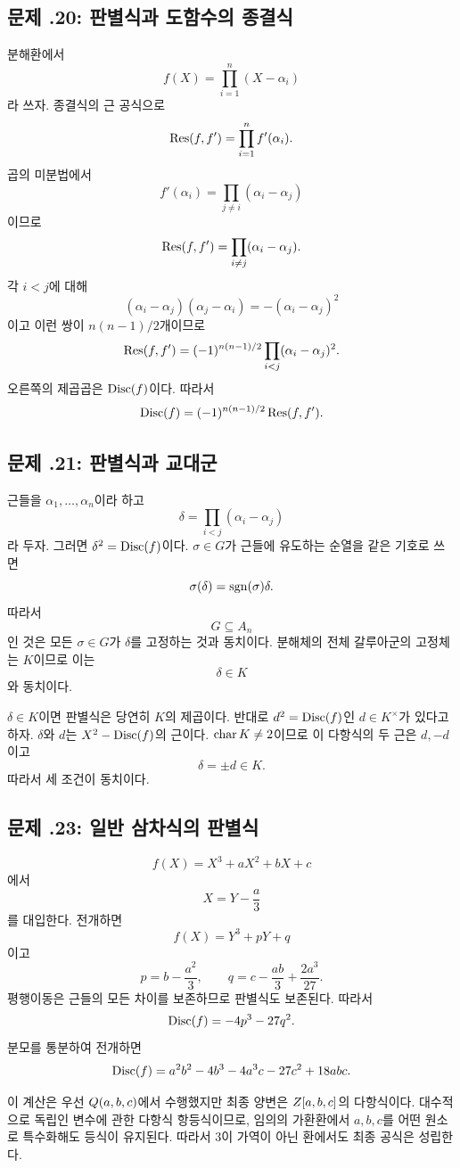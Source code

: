 \subsection*{문제 \thechapter.20: 판별식과 도함수의 종결식}

\begin{solution}
분해환에서
\[
  f(X)=\prod_{i=1}^n(X-\alpha_i)
\]
라 쓰자. 종결식의 근 공식으로
\[
  \operatorname{Res}(f,f')=\prod_{i=1}^n f'(\alpha_i).
\]
곱의 미분법에서
\[
  f'(\alpha_i)=\prod_{j\ne i}(\alpha_i-\alpha_j)
\]
이므로
\[
  \operatorname{Res}(f,f')
  =\prod_{i\ne j}(\alpha_i-\alpha_j).
\]
각 $i<j$에 대해
\[
  (\alpha_i-\alpha_j)(\alpha_j-\alpha_i)
  =-(\alpha_i-\alpha_j)^2
\]
이고 이런 쌍이 $n(n-1)/2$개이므로
\[
  \operatorname{Res}(f,f')
  =(-1)^{n(n-1)/2}
  \prod_{i<j}(\alpha_i-\alpha_j)^2.
\]
오른쪽의 제곱곱은 $\operatorname{Disc}(f)$이다. 따라서
\[
  \operatorname{Disc}(f)=(-1)^{n(n-1)/2}\operatorname{Res}(f,f').
\]
\end{solution}

\subsection*{문제 \thechapter.21: 판별식과 교대군}

\begin{solution}
근들을 $\alpha_1,\dots,\alpha_n$이라 하고
\[
  \delta=\prod_{i<j}(\alpha_i-\alpha_j)
\]
라 두자. 그러면 $\delta^2=\operatorname{Disc}(f)$이다. $\sigma\in G$가 근들에 유도하는 순열을 같은 기호로 쓰면
\[
  \sigma(\delta)=\operatorname{sgn}(\sigma)\delta.
\]
따라서
\[
  G\subseteq A_n
\]
인 것은 모든 $\sigma\in G$가 $\delta$를 고정하는 것과 동치이다. 분해체의 전체 갈루아군의 고정체는 $K$이므로 이는
\[
  \delta\in K
\]
와 동치이다.

$\delta\in K$이면 판별식은 당연히 $K$의 제곱이다. 반대로 $d^2=\operatorname{Disc}(f)$인 $d\in K^\times$가 있다고 하자. $\delta$와 $d$는 $X^2-\operatorname{Disc}(f)$의 근이다. $\operatorname{char} K\ne2$이므로 이 다항식의 두 근은 $d,-d$이고
\[
  \delta=\pm d\in K.
\]
따라서 세 조건이 동치이다.
\end{solution}

\subsection*{문제 \thechapter.23: 일반 삼차식의 판별식}

\begin{solution}
\[
  f(X)=X^3+aX^2+bX+c
\]
에서
\[
  X=Y-\frac a3
\]
를 대입한다. 전개하면
\[
  f(X)=Y^3+pY+q
\]
이고
\[
  p=b-\frac{a^2}{3},
  \qquad
  q=c-\frac{ab}{3}+\frac{2a^3}{27}.
\]
평행이동은 근들의 모든 차이를 보존하므로 판별식도 보존된다. 따라서
\[
  \operatorname{Disc}(f)=-4p^3-27q^2.
\]
분모를 통분하여 전개하면
\[
  \operatorname{Disc}(f)
  =a^2b^2-4b^3-4a^3c-27c^2+18abc.
\]

이 계산은 우선 $Q(a,b,c)$에서 수행했지만 최종 양변은 $Z[a,b,c]$의 다항식이다. 대수적으로 독립인 변수에 관한 다항식 항등식이므로, 임의의 가환환에서 $a,b,c$를 어떤 원소로 특수화해도 등식이 유지된다. 따라서 $3$이 가역이 아닌 환에서도 최종 공식은 성립한다.
\end{solution}

